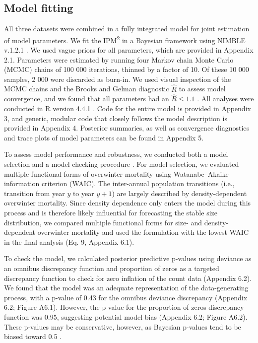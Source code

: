 \documentclass{article}
\begin{document}
\subsection{Model fitting}
All three datasets were combined in a fully integrated model for joint estimation of model parameters. We fit the IPM\textsuperscript{2} in a Bayesian framework using NIMBLE v.1.2.1 \parencite{de2017programming}. We used vague priors for all parameters, which are provided in Appendix 2.1. Parameters were estimated by running four Markov chain Monte Carlo (MCMC) chains of 100 000 iterations, thinned by a factor of 10. Of these 10 000 samples, 2 000 were discarded as burn-in. We used visual inspection of the MCMC chains and the Brooks and Gelman diagnostic $\hat{R}$ to assess model convergence, and we found that all parameters had an $\hat{R} \leq 1.1$ \parencite{brooks1998general}. All analyses were conducted in R version 4.4.1 \parencite{Rcore}. Code for the entire model is provided in Appendix 3, and generic, modular code that closely follows the model description is provided in Appendix 4. Posterior summaries, as well as convergence diagnostics and trace plots of model parameters can be found in Appendix 5. 

To assess model performance and robustness, we conducted both a model selection and a model checking procedure \parencite{conn2018guide}. For model selection, we evaluated multiple functional forms of overwinter mortality using Watanabe–Akaike information criterion (WAIC). The inter-annual population transitions (i.e., transition from year $y$ to year $y + 1$) are largely described by density-dependent overwinter mortality. Since density dependence only enters the model during this process and is therefore likely influential for forecasting the stable size distribution, we compared multiple functional forms for size- and density-dependent overwinter mortality and used the formulation with the lowest WAIC in the final analysis (Eq. 9, Appendix 6.1).

To check the model, we calculated posterior predictive p-values using deviance as an omnibus discrepancy function and proportion of zeros as a targeted discrepancy function to check for zero inflation of the count data (Appendix 6.2). We found that the model was an adequate representation of the data-generating process, with a p-value of 0.43 for the omnibus deviance discrepancy (Appendix 6.2; Figure A6.1). However, the p-value for the proportion of zeros discrepancy function was 0.95, suggesting potential model bias (Appendix 6.2; Figure A6.2). These p-values may be conservative, however, as Bayesian p-values tend to be biased toward 0.5 \parencite{conn2018guide}.
\end{document}
